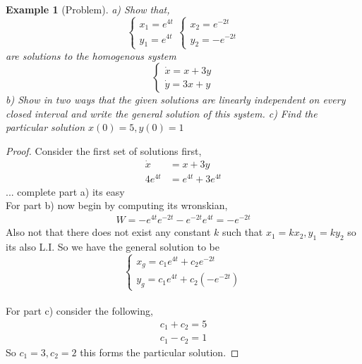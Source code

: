 \documentclass[oneside,11pt,pdftex,final]{book}%
\numberwithin{equation}{section}
\newtheorem{example}[theorem]{Example}
\numberwithin{section}{chapter}
\numberwithin{equation}{chapter}
\begin{document}
\begin{example}[Problem]
	a) Show that,
	\[ \begin{cases}
		x_1=e^{4t}\\
		y_1=e^{4t}
	\end{cases} \begin{cases}
	x_2=e^{-2t}\\
	y_2=-e^{-2t}
\end{cases}\] are solutions to the homogenous system
\[ \begin{cases}
	\dot{x}=x+3y\\
	\dot{y}=3x+y
\end{cases} \]
b) Show in two ways that the given solutions are linearly independent on every closed interval and write the general solution of this system.
c) Find the particular solution $ x(0) =5, y(0)=1$
\end{example}
\begin{proof}
	Consider the first set of solutions first,
	\begin{align*}
		\dot{x}&=x+3y\\
		4e^{4t}&=e^{4t}+3e^{4t}
	\end{align*}
	... complete part a) its easy\\
	For part b) now begin by computing its wronskian,
	\begin{align*}
		W=-e^{4t}e^{-2t}-e^{-2t}e^{4t}=-e^{-2t}
	\end{align*}
Also not that there does not exist any constant $ k $ such that $ x_1=kx_2, y_1=ky_2 $ so its also L.I. So we have the general solution to be \[ \begin{cases}
	x_g=c_1e^{4t}+c_2e^{-2t}\\
	y_g=c_1e^{4t}+c_2(-e^{-2t})
\end{cases} \]\\
For part c) consider the following,
\begin{align*}
	c_1+c_2=5\\
	c_1-c_2=1
\end{align*}
So $ c_1=3,c_2=2 $ this forms the particular solution.
\end{proof}
\end{document}
